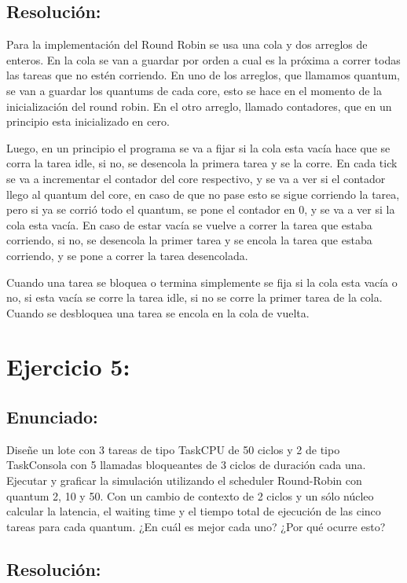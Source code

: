 \documentclass[10pt, a4paper]{article}
\begin{document}
\subsection{Resolución:}
Para la implementación del Round Robin se usa una cola y dos arreglos de enteros. En la cola se van a guardar por orden a cual es la próxima a correr todas las tareas que no estén corriendo. En uno de los arreglos, que llamamos quantum, se van a guardar  los quantums de cada core, esto se hace en el momento de la inicialización del round robin. En el otro arreglo, llamado contadores, que en un principio esta inicializado en cero.

Luego, en un principio el programa se va a fijar si la cola esta vacía hace que se corra la tarea idle, si no, se desencola la primera tarea y se la corre. En cada tick se va a incrementar el contador del core respectivo, y se va a ver si el contador llego al quantum del core, en caso de que no pase esto se sigue corriendo la tarea, pero si ya se corrió todo el quantum, se pone el contador en 0, y se va a ver si la cola esta vacía. En caso de estar vacía se vuelve a correr la tarea que estaba corriendo, si no, se desencola la primer tarea y se encola la tarea que estaba corriendo, y se pone a correr la tarea desencolada.

Cuando una tarea se bloquea o termina simplemente se fija si la cola esta vacía o no, si esta vacía se corre la tarea idle, si no se corre la primer tarea de la cola. Cuando se desbloquea una tarea se encola en la cola de vuelta.

\section{Ejercicio 5:}

\subsection{Enunciado:}
Diseñe un lote con 3 tareas de tipo TaskCPU de 50 ciclos y 2 de tipo TaskConsola con 5 llamadas bloqueantes de 3 ciclos de duración cada una. Ejecutar y graficar la simulación utilizando el scheduler Round-Robin con quantum 2, 10 y 50. Con un cambio de contexto de 2 ciclos y un sólo núcleo calcular la latencia, el waiting time y el tiempo total de ejecución de las cinco tareas para cada quantum. ¿En cuál es mejor cada uno? ¿Por qué ocurre esto?

\subsection{Resolución:}
\end{document}

